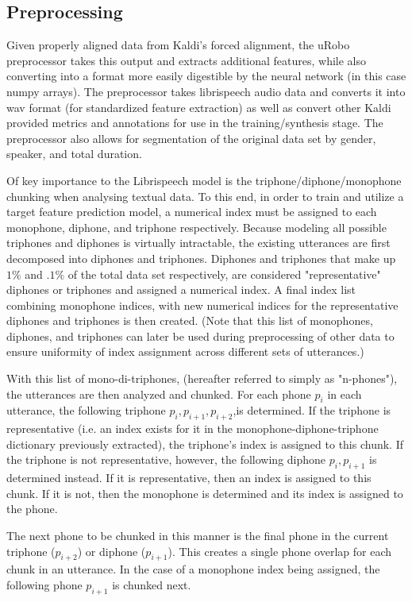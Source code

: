 \documentclass[10pt, journal, compsoc]{IEEEtran}
\begin{document}
\subsection{Preprocessing}
Given properly aligned data from Kaldi's forced alignment, the uRobo preprocessor takes this output and extracts additional features, while also converting into a format more easily digestible by the neural network (in this case numpy arrays). The preprocessor takes librispeech audio data and converts it into wav format (for standardized feature extraction) as well as convert other Kaldi provided metrics and annotations for use in the training/synthesis stage. The preprocessor also allows for segmentation of the original data set by gender, speaker, and total duration.\par
Of key importance to the Librispeech model is the triphone/diphone/monophone chunking when analysing textual data. To this end, in order to train and utilize a target feature prediction model, a numerical index must be assigned to each monophone, diphone, and triphone respectively. Because modeling all possible triphones and diphones is virtually intractable, the existing utterances are first decomposed into diphones and triphones. Diphones and triphones that make up $1\%$ and $.1\%$ of the total data set respectively, are considered "representative" diphones or triphones and assigned a numerical index. A final index list combining monophone indices, with new numerical indices for the representative diphones and triphones is then created. (Note that this list of monophones, diphones, and triphones can later be used during preprocessing of other data to ensure uniformity of index assignment across different sets of utterances.)\par
With this list of mono-di-triphones, (hereafter referred to simply as "n-phones"), the utterances are then analyzed and chunked. For each phone $p_i$ in each utterance, the following triphone $p_i,p_{i+1},p_{i+2}$,is determined. If the triphone is representative (i.e. an index exists for it in the monophone-diphone-triphone dictionary previously extracted), the triphone's index is assigned to this chunk. If the triphone is not representative, however, the following diphone $p_i,p_{i+1}$ is determined instead. If it is representative, then an index is assigned to this chunk. If it is not, then the monophone is determined and its index is assigned to the phone.\par
The next phone to be chunked in this manner is the final phone in the current triphone ($p_{i+2}$) or diphone ($p_{i+1}$). This creates a single phone overlap for each chunk in an utterance. In the case of a monophone index being assigned, the following phone $p_{i+1}$ is chunked next.\par
\end{document}
